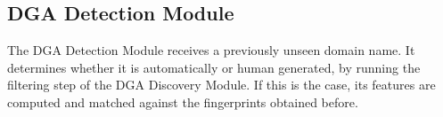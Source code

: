 \subsection{DGA Detection Module} %
\label{ssub:dga_detection_module}
The DGA Detection Module receives a previously unseen domain name. It determines
whether it is automatically or human generated, by running the filtering step of the
DGA Discovery Module. If this is the case, its features are computed and matched
against the fingerprints obtained before.
